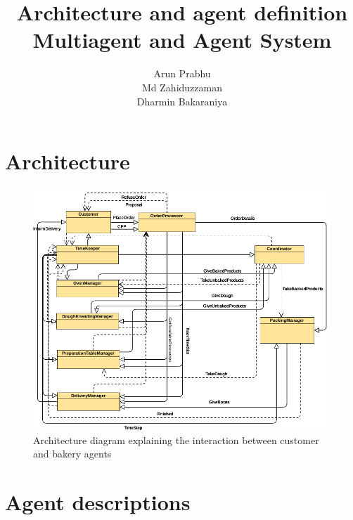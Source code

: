\documentclass[12pt]{article}
\title{Architecture and agent definition\\Multiagent and Agent System}
\author{Arun Prabhu\\Md Zahiduzzaman\\Dharmin Bakaraniya}
\begin{document}
\maketitle{}
\pagebreak
\section{Architecture}%
\label{sec:architecture}

\begin{figure}[htpb]
    \centering
    \includegraphics[width=1.0\linewidth]{Bakery.png}
    \caption{Architecture diagram explaining the interaction between customer and bakery agents}\label{fig:somename}
\end{figure}

\pagebreak

\section{Agent descriptions}%
\label{sec:agent_descriptions}
\end{document}
